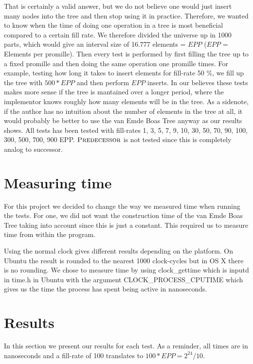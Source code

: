 \documentclass[oneside,11pt,openright]{report}
\newcommand{\Predecessor}{\textsc{Predecessor}}
\begin{document}
That is certainly a valid answer, but we do not believe one would just insert many nodes into the tree and then stop using it in practice. Therefore, we wanted to know when the time of doing one operation in a tree is most beneficial compared to a certain fill rate. We therefore divided the universe up in 1000 parts, which would give an interval size of 16.777 elements = $EPP$ ($EPP$ = Elements per promille). Then every test is performed by first filling the tree up to a fixed promille and then doing the same operation one promille times. For example, testing how long it takes to insert elements for fill-rate 50 \%, we fill up the tree with $500 * EPP$ and then perform $EPP$ inserts. In our believes these tests makes more sense if the tree is mantained over a longer period, where the implementor knows roughly how many elements will be in the tree. As a sidenote, if the author has no intuition about the number of elements in the tree at all, it would probably be better to use the van Emde Boas Tree anyway as our results shows. All tests has been tested with fill-rates 1, 3, 5, 7, 9, 10, 30, 50, 70, 90, 100, 300, 500, 700, 900 EPP. $\Predecessor$ is not tested since this is completely analog to successor.

\section{Measuring time}

For this project we decided to change the way we measured time when running the tests. For one, we did not want the construction time of the van Emde Boas Tree taking into account since this is just a constant. This required us to measure time from within the program.

Using the normal clock gives different results depending on the platform. On Ubuntu the result is rounded to the nearest 1000 clock-cycles but in OS X there is no rounding. We chose to measure time by using clock\_gettime which is inputd in time.h in Ubuntu with the argument CLOCK\_PROCESS\_CPUTIME which gives us the time the process has spent being active in nanoseconds.

\section{Results}

In this section we present our results for each test. As a reminder, all times are in nanoseconds and a fill-rate of 100 translates to $100 * EPP = 2^{24}/10$.
\end{document}
